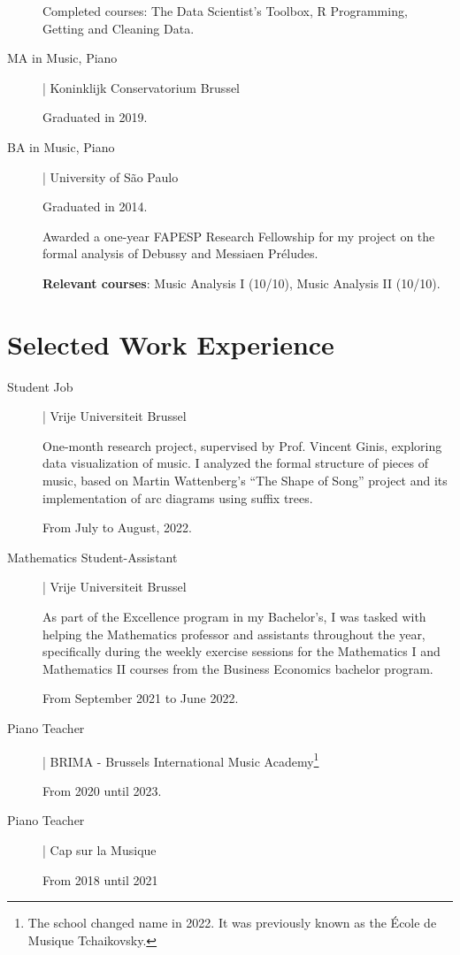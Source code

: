 \documentclass[12pt]{article}
\newcommand{\mycolor}{mySlateBlue}
\newcommand{\thesectionicon}{}
\newcommand{\sectionicon}[1]{\renewcommand{\thesectionicon}{#1}}
\begin{document}
\begin{description}
  
Completed courses: The Data Scientist’s Toolbox, R Programming, Getting and Cleaning Data.  

\item[\textcolor{\mycolor}{MA in Music, Piano}] | Koninklijk Conservatorium Brussel

Graduated in 2019.

\item[\textcolor{\mycolor}{BA in Music, Piano}] | University of São Paulo

Graduated in 2014.

Awarded a one-year FAPESP Research Fellowship for my project on the formal analysis of Debussy and Messiaen Préludes.

\textbf{Relevant courses}: Music Analysis I (10/10), Music Analysis II (10/10).

\end{description}

\sectionicon{\faToolbox}
\section{Selected Work Experience}
\begin{description} 
\item[\textcolor{\mycolor}{Student Job}] | Vrije Universiteit Brussel

One-month research project, supervised by Prof. Vincent Ginis, exploring data visualization of music. I analyzed the formal structure of pieces of music, based on Martin Wattenberg’s “The Shape of Song” project and its implementation of arc diagrams using suffix trees.
  
From July to August, 2022.

\item[\textcolor{\mycolor}{Mathematics Student-Assistant}] | Vrije Universiteit Brussel

As part of the Excellence program in my Bachelor’s, I was tasked with helping the Mathematics professor and assistants throughout the year, specifically during the weekly exercise sessions for the Mathematics I and Mathematics II courses from the Business Economics bachelor program.

From September 2021 to June 2022.

\item[\textcolor{\mycolor}{Piano Teacher}] | BRIMA - Brussels International Music Academy\footnote{The school changed name in 2022. It was previously known as the École de Musique Tchaikovsky.}
  
From 2020 until 2023.

\item[\textcolor{\mycolor}{Piano Teacher}] | Cap sur la Musique

From 2018 until 2021

\end{description}
\end{document}
